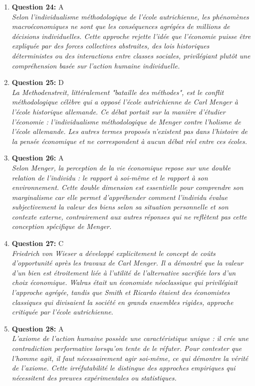 \documentclass[12pt,a4paper]{article}
\begin{document}
\begin{enumerate}
\item \textbf{Question 24:} A
\\ \textit{Selon l'individualisme méthodologique de l'école autrichienne, les phénomènes macroéconomiques ne sont que les conséquences agrégées de millions de décisions individuelles. Cette approche rejette l'idée que l'économie puisse être expliquée par des forces collectives abstraites, des lois historiques déterministes ou des interactions entre classes sociales, privilégiant plutôt une compréhension basée sur l'action humaine individuelle.}

\item \textbf{Question 25:} D
\\ \textit{La Methodenstreit, littéralement "bataille des méthodes", est le conflit méthodologique célèbre qui a opposé l'école autrichienne de Carl Menger à l'école historique allemande. Ce débat portait sur la manière d'étudier l'économie : l'individualisme méthodologique de Menger contre l'holisme de l'école allemande. Les autres termes proposés n'existent pas dans l'histoire de la pensée économique et ne correspondent à aucun débat réel entre ces écoles.}

\item \textbf{Question 26:} A
\\ \textit{Selon Menger, la perception de la vie économique repose sur une double relation de l'individu : le rapport à soi-même et le rapport à son environnement. Cette double dimension est essentielle pour comprendre son marginalisme car elle permet d'appréhender comment l'individu évalue subjectivement la valeur des biens selon sa situation personnelle et son contexte externe, contrairement aux autres réponses qui ne reflètent pas cette conception spécifique de Menger.}

\item \textbf{Question 27:} C
\\ \textit{Friedrich von Wieser a développé explicitement le concept de coûts d'opportunité après les travaux de Carl Menger. Il a démontré que la valeur d'un bien est étroitement liée à l'utilité de l'alternative sacrifiée lors d'un choix économique. Walras était un économiste néoclassique qui privilégiait l'approche agrégée, tandis que Smith et Ricardo étaient des économistes classiques qui divisaient la société en grands ensembles rigides, approche critiquée par l'école autrichienne.}

\item \textbf{Question 28:} A
\\ \textit{L'axiome de l'action humaine possède une caractéristique unique : il crée une contradiction performative lorsqu'on tente de le réfuter. Pour contester que l'homme agit, il faut nécessairement agir soi-même, ce qui démontre la vérité de l'axiome. Cette irréfutabilité le distingue des approches empiriques qui nécessitent des preuves expérimentales ou statistiques.}


\end{enumerate}
\end{document}

